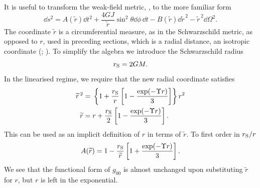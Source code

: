 It is useful to transform the weak-field metric, , to the more familiar form
\begin{equation}
\dd s^2 = A(\widetilde{r}) \dd t^2 + \dfrac{4GJ}{\widetilde{r}} \sin^2\theta \dd \phi \,\dd t - B(\widetilde{r})\dd \widetilde{r}^{\,2} - \widetilde{r}^{\,2} \dd \Omega^2.
\label{eq:Sph_sym}
\end{equation}
The coordinate $\widetilde{r}$ is a circumferential measure, as in the Schwarzschild metric, as opposed to $r$, used in preceding sections, which is a radial distance, an isotropic coordinate (\citealt[section 40.1]{Misner1973}; \citealt{Olmo2007c}). To simplify the algebra we introduce the Schwarzschild radius
\begin{equation}
r_\mathrm{S} = 2GM.
\end{equation}
In the linearised regime, we require that the new radial coordinate satisfies
\begin{align}
\widetilde{r}^{\,2} = {} & \left\{1 + \dfrac{r_\mathrm{S}}{r}\left[1 - \dfrac{\exp(-\Upsilon r)}{3}\right]\right\}r^2 \\
\widetilde{r} = {} & r + \dfrac{r_\mathrm{S}}{2}\left[1 - \dfrac{\exp(-\Upsilon r)}{3}\right].
\label{eq:r_tilde}
\end{align}
This can be used as an implicit definition of $r$ in terms of $\widetilde{r}$. To first order in ${r_\mathrm{S}}/{r}$ \citep{Olmo2007c}
\begin{equation}
A(\widetilde{r}) = 1 - \dfrac{r_\mathrm{S}}{\widetilde{r}}\left[1 + \dfrac{\exp(-\Upsilon r )}{3}\right].
\label{eq:A_metric}
\end{equation}
We see that the functional form of $g_{00}$ is almost unchanged upon substituting $\widetilde{r}$ for $r$, but $r$ is left in the exponential.

